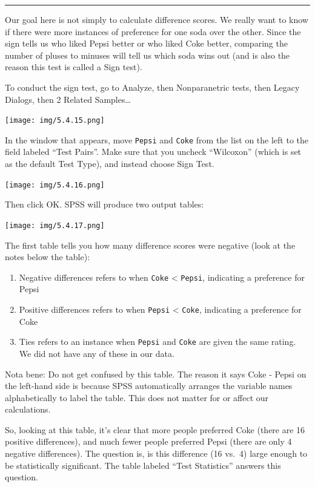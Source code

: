 \documentclass[]{book}
\providecommand{\tightlist}{%
  \setlength{\itemsep}{0pt}\setlength{\parskip}{0pt}}
\begin{document}
\begin{center}\rule{0.5\linewidth}{0.5pt}\end{center}

Our goal here is not simply to calculate difference scores. We really
want to know if there were more instances of preference for one soda
over the other. Since the sign tells us who liked Pepsi better or who
liked Coke better, comparing the number of pluses to minuses will tell
us which soda wins out (and is also the reason this test is called a
Sign test).

To conduct the sign test, go to {Analyze}, then {Nonparanetric tests},
then {Legacy Dialogs}, then {2 Related Samples\ldots{}}

\texttt{[image: img/5.4.15.png]}

In the window that appears, move \texttt{Pepsi} and \texttt{Coke} from
the list on the left to the field labeled ``Test Pairs''. Make sure that
you uncheck ``Wilcoxon'' (which is set as the default Test Type), and
instead choose {Sign Test}.

\texttt{[image: img/5.4.16.png]}

Then click {OK}. SPSS will produce two output tables:

\texttt{[image: img/5.4.17.png]}

The first table tells you how many difference scores were negative (look
at the notes below the table):

\begin{enumerate}
\def\labelenumi{\alph{enumi}.}
\tightlist
\item
  Negative differences refers to when \texttt{Coke} \textless{}
  \texttt{Pepsi}, indicating a preference for Pepsi
\item
  Positive differences refers to when \texttt{Pepsi} \textless{}
  \texttt{Coke}, indicating a preference for Coke
\item
  Ties refers to an instance when \texttt{Pepsi} and \texttt{Coke} are
  given the same rating. We did not have any of these in our data.
\end{enumerate}

Nota bene: Do not get confused by this table. The reason it says Coke -
Pepsi on the left-hand side is because SPSS automatically arranges the
variable names alphabetically to label the table. This does not matter
for or affect our calculations.

So, looking at this table, it's clear that more people preferred Coke
(there are 16 positive differences), and much fewer people preferred
Pepsi (there are only 4 negative differences). The question is, is this
difference (16 vs.~4) large enough to be statistically significant. The
table labeled ``Test Statistics'' answers this question.
\end{document}
